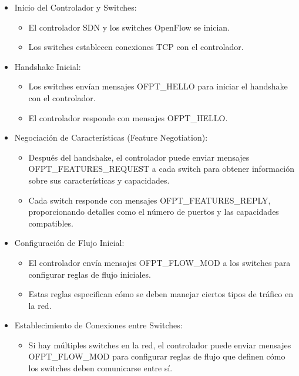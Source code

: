 \documentclass[a4paper, 12pt]{book}
\begin{document}
\begin{itemize}
	\item Inicio del Controlador y Switches:
	\begin{itemize}
		\item El controlador SDN y los switches OpenFlow se inician.
		\item Los switches establecen conexiones TCP con el controlador.
	\end{itemize}
	
	\item Handshake Inicial:
	\begin{itemize}
		\item Los switches envían mensajes OFPT\_HELLO para iniciar el handshake con el controlador.
		\item El controlador responde con mensajes OFPT\_HELLO.
	\end{itemize}
	
	\item Negociación de Características (Feature Negotiation):
	\begin{itemize}
		\item Después del handshake, el controlador puede enviar mensajes OFPT\_FEATURES\_REQUEST
		a cada switch para obtener información sobre sus características y capacidades.
		\item Cada switch responde con mensajes OFPT\_FEATURES\_REPLY, proporcionando detalles como
		el número de puertos y las capacidades compatibles.
	\end{itemize}
	
	\item Configuración de Flujo Inicial:
	\begin{itemize}
		\item El controlador envía mensajes OFPT\_FLOW\_MOD a los switches para configurar reglas
		de flujo iniciales.
		\item Estas reglas especifican cómo se deben manejar ciertos tipos de tráfico en la red.
	\end{itemize}
	
	\item Establecimiento de Conexiones entre Switches:
	\begin{itemize}
		\item Si hay múltiples switches en la red, el controlador puede enviar mensajes
		OFPT\_FLOW\_MOD para configurar reglas de flujo que definen cómo los switches deben
		comunicarse entre sí.
	\end{itemize}
	

\end{itemize}
\end{document}
